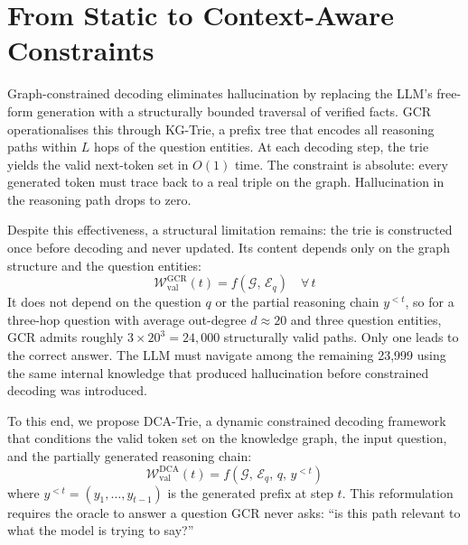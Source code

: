 
\section{From Static to Context-Aware Constraints}
\label{sec:method}

Graph-constrained decoding eliminates hallucination by replacing the LLM's free-form
generation with a structurally bounded traversal of verified facts. GCR~\citep{luo2025-graph-constrained-reasoning}
operationalises this through KG-Trie, a prefix tree that encodes all reasoning paths
within $L$ hops of the question entities. At each decoding step, the trie yields the
valid next-token set in $O(1)$ time. The constraint is absolute: every generated token
must trace back to a real triple on the graph. Hallucination in the reasoning path
drops to zero.

Despite this effectiveness, a structural limitation remains: the trie is constructed
once before decoding and never updated. Its content depends only on the graph structure
and the question entities:
\begin{equation}
  \mathcal{W}_{\text{val}}^{\text{GCR}}(t) = f(\mathcal{G},\, \mathcal{E}_q)
  \quad \forall\, t
   \label{eq:gcr_oracle}
\end{equation}
It does not depend on the question $q$ or the partial reasoning chain $y^{<t}$, so for a
three-hop question with average out-degree $d \approx 20$ and three question entities,
GCR admits roughly $3 \times 20^3 = 24{,}000$ structurally valid paths. Only one leads
to the correct answer. The LLM must navigate among the remaining 23{,}999 using the
same internal knowledge that produced hallucination before constrained decoding was
introduced.

To this end, we propose DCA-Trie, a dynamic constrained decoding framework that
conditions the valid token set on the knowledge graph, the input question, and the
partially generated reasoning chain:
\begin{equation}
  \mathcal{W}_{\text{val}}^{\text{DCA}}(t) = f(\mathcal{G},\, \mathcal{E}_q,\,
  q,\, y^{<t})
  \label{eq:dca_oracle}
\end{equation}
where $y^{<t} = (y_1, \ldots, y_{t-1})$ is the generated prefix at step $t$. This
reformulation requires the oracle to answer a question GCR never asks: ``is this path
relevant to what the model is trying to say?''

